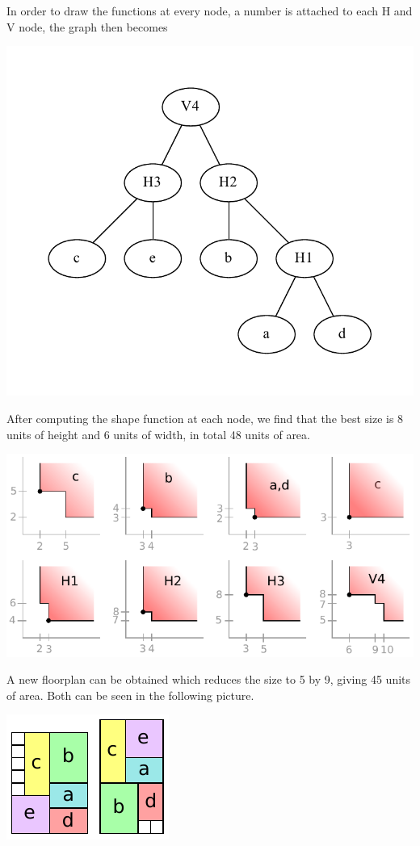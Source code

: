 \documentclass[a4paper]{article}
\begin{document}
In order to draw the functions at every node, a number is attached to each H and 
V node, the graph then becomes
%
\begin{center}
\includegraphics[width=.5\textwidth]{floor-graph.pdf}
\end{center}
%
After computing the shape function at each node, we find that the best size is 
8 units of height and 6 units of width, in total 48 units of area.
%
\begin{center}
\includegraphics[width=.9\textwidth]{floorplan.pdf}
\end{center}
%
A new floorplan can be obtained which reduces the size to 5 by 9, giving 45 
units of area. Both can be seen in the following picture.
%
\begin{center}
\includegraphics[width=.4\textwidth]{plans.pdf}
\end{center}
%
\end{document}
